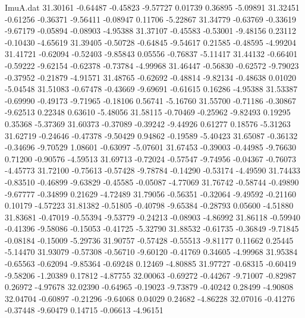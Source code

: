 \begin{filecontents}{ImuA.dat}
  31.30161   -0.64487   -0.45823   -9.57727    0.01739    0.36895   -5.09891
  31.32451   -0.61256   -0.36371   -9.56411   -0.08947    0.11706   -5.22867
  31.34779   -0.63769   -0.33619   -9.67179   -0.05894   -0.08903   -4.95388
  31.37107   -0.45583   -0.53001   -9.48156    0.23112   -0.10430   -4.65619
  31.39405   -0.50728   -0.64845   -9.54617    0.21585   -0.48595   -4.99204
  31.41721   -0.62094   -0.52403   -9.85843    0.05556   -0.76837   -5.11417
  31.44132   -0.66401   -0.59222   -9.62154   -0.62378   -0.73784   -4.99968
  31.46447   -0.56830   -0.62572   -9.79023   -0.37952   -0.21879   -4.91571
  31.48765   -0.62692   -0.48814   -9.82134   -0.48638    0.01020   -5.04548
  31.51083   -0.67478   -0.43669   -9.69691   -0.61615    0.16286   -4.95388
  31.53387   -0.69990   -0.49173   -9.71965   -0.18106    0.56741   -5.16760
  31.55700   -0.71186   -0.30867   -9.62513    0.22348    0.63610   -5.48056
  31.58115   -0.70469   -0.25962   -9.82493    0.19295    0.35368   -5.37369
  31.60373   -0.37089   -0.39242   -9.44926    0.61277    0.18576   -5.31263
  31.62719   -0.24646   -0.47378   -9.50429    0.94862   -0.19589   -5.40423
  31.65087   -0.36132   -0.34696   -9.70529    1.08601   -0.63097   -5.07601
  31.67453   -0.39003   -0.44985   -9.76630    0.71200   -0.90576   -4.59513
  31.69713   -0.72024   -0.57547   -9.74956   -0.04367   -0.76073   -4.45773
  31.72100   -0.75613   -0.57428   -9.78784   -0.14290   -0.53174   -4.49590
  31.74433   -0.83510   -0.46899   -9.63829   -0.45585   -0.05087   -4.77069
  31.76742   -0.58744   -0.49890   -9.67777   -0.34899    0.21629   -4.72489
  31.79056   -0.56351   -0.32064   -9.49592   -0.21160    0.10179   -4.57223
  31.81382   -0.51805   -0.40798   -9.65384   -0.28793    0.05600   -4.51880
  31.83681   -0.47019   -0.55394   -9.53779   -0.24213   -0.08903   -4.86992
  31.86118   -0.59940   -0.41396   -9.58086   -0.15053   -0.41725   -5.32790
  31.88532   -0.61735   -0.36849   -9.71845   -0.08184   -0.15009   -5.29736
  31.90757   -0.57428   -0.55513   -9.81177    0.11662    0.25445   -5.14470
  31.93079   -0.57308   -0.56710   -9.60120   -0.41769    0.34605   -4.99968
  31.95384   -0.65563   -0.62094   -9.85364   -0.69248    0.12469   -4.80885
  31.97727   -0.68315   -0.60419   -9.58206   -1.20389    0.17812   -4.87755
  32.00063   -0.69272   -0.44267   -9.71007   -0.82987    0.26972   -4.97678
  32.02390   -0.64965   -0.19023   -9.73879   -0.40242    0.28499   -4.90808
  32.04704   -0.60897   -0.21296   -9.64068    0.04029    0.24682   -4.86228
  32.07016   -0.41276   -0.37448   -9.60479    0.14715   -0.06613   -4.96151

\end{filecontents}
